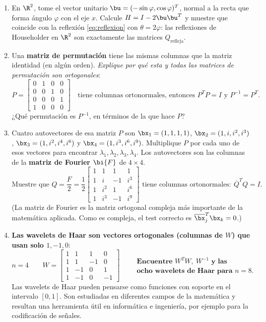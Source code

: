 \begin{enumerate}[leftmargin=*,label=\textbf{\thechapter.\arabic*}]
\item {} En $\R^2$, tome el vector unitario
$\bu=(-\sin\varphi,\cos\varphi)^T$, normal a la recta que forma ángulo
$\varphi$ con el eje $x$. Calcule $H=I-2\bu\bu^T$ y muestre que
coincide con la reflexión \eqref{eq:reflexion} con $\theta=2\varphi$: las
reflexiones de Householder en $\R^2$ son exactamente las matrices
$Q_{\text{refleja}}$.

\item {} Una \textbf{matriz de permutación} tiene las mismas
columnas que la matriz identidad (en algún orden). \emph{Explique por qué
esta y todas las matrices de permutación son ortogonales}:
\[
P=\begin{bmatrix}0&1&0&0\\0&0&1&0\\0&0&0&1\\1&0&0&0\end{bmatrix}
\quad\text{tiene columnas ortonormales, entonces } P^T P=I
\text{ y } P^{-1}=P^T .
\]
¿Qué permutación es $P^{-1}$, en términos de la que hace $P$?

\item {} Cuatro autovectores de esa matriz $P$ son
$\bx_1=(1,1,1,1)$, $\bx_2=(1,i,i^2,i^3)$, $\bx_3=(1,i^2,i^4,i^6)$ y
$\bx_4=(1,i^3,i^6,i^9)$. Multiplique $P$ por cada uno de esos vectores para
encontrar $\lambda_1,\lambda_2,\lambda_3,\lambda_4$. Los autovectores son
las columnas de la \textbf{matriz de Fourier $\bi{F}$} de $4\times4$.
\[
\text{Muestre que } Q=\frac{F}{2}=\frac12
\begin{bmatrix}1&1&1&1\\1&i&-1&i^3\\1&i^2&1&i^6\\1&i^3&-1&i^9\end{bmatrix}
\text{ tiene columnas ortonormales}:\ \overline{Q}^T Q=I .
\]
(La matriz de Fourier es la matriz ortogonal compleja más importante de la
matemática aplicada. Como es compleja, el test correcto es
$\overline{\bx}_j^T\bx_k=0$.)

\item {} \textbf{Las wavelets de Haar son vectores ortogonales
(columnas de $W$) que usan solo $1,-1,0$}:
\[
n=4\qquad
W=\begin{bmatrix}1&1&1&0\\1&1&-1&0\\1&-1&0&1\\1&-1&0&-1\end{bmatrix}
\qquad
\begin{array}{l}
\textbf{Encuentre } W^T W,\ W^{-1}\textbf{ y las}\\
\textbf{ocho wavelets de Haar para } n=8 .
\end{array}
\]
Las wavelets de Haar pueden pensarse como funciones con soporte en el
intervalo $[0,1]$. Son estudiadas en diferentes campos de la matemática y
resultan una herramienta útil en informática e ingeniería, por ejemplo para
la codificación de señales.


\end{enumerate}
